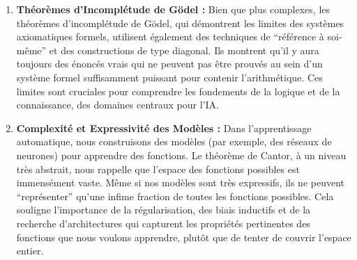 \documentclass[12pt,a4paper]{report}
\providecommand{\tightlist}{%
  \setlength{\itemsep}{0pt}\setlength{\parskip}{0pt}}
\begin{document}
\begin{enumerate}
  \begin{itemize}
  \tightlist
  \item
    Le théorème de Cantor montre que l'ensemble des sous-ensembles d'un
    ensemble est ``plus grand'' que l'ensemble lui-même. En IA, cela
    peut être interprété comme une limite à la capacité de représenter
    toutes les ``idées'' ou ``concepts'' (qui pourraient être vus comme
    des sous-ensembles d'un espace de base) en utilisant un système de
    symboles ou un langage formel qui a la même ``taille'' que l'espace
    de base.
  \item
    Par exemple, l'ensemble des fonctions de \(\mathbb{N}\) vers
    \(\mathbb{N}\) est non-dénombrable (a la même cardinalité que
    \(\mathcal{P}(\mathbb{N})\)), tandis que l'ensemble des programmes
    informatiques est dénombrable. Cela signifie qu'il existe infiniment
    plus de fonctions que de programmes pour les calculer. La plupart
    des fonctions ne sont donc pas calculables par un algorithme. C'est
    une limite fondamentale pour l'IA symbolique et algorithmique.
  \end{itemize}
\item
  \textbf{Théorèmes d'Incomplétude de Gödel :} Bien que plus complexes,
  les théorèmes d'incomplétude de Gödel, qui démontrent les limites des
  systèmes axiomatiques formels, utilisent également des techniques de
  ``référence à soi-même'' et des constructions de type diagonal. Ils
  montrent qu'il y aura toujours des énoncés vrais qui ne peuvent pas
  être prouvés au sein d'un système formel suffisamment puissant pour
  contenir l'arithmétique. Ces limites sont cruciales pour comprendre
  les fondements de la logique et de la connaissance, des domaines
  centraux pour l'IA.
\item
  \textbf{Complexité et Expressivité des Modèles :} Dans l'apprentissage
  automatique, nous construisons des modèles (par exemple, des réseaux
  de neurones) pour apprendre des fonctions. Le théorème de Cantor, à un
  niveau très abstrait, nous rappelle que l'espace des fonctions
  possibles est immensément vaste. Même si nos modèles sont très
  expressifs, ils ne peuvent ``représenter'' qu'une infime fraction de
  toutes les fonctions possibles. Cela souligne l'importance de la
  régularisation, des biais inductifs et de la recherche d'architectures
  qui capturent les propriétés pertinentes des fonctions que nous
  voulons apprendre, plutôt que de tenter de couvrir l'espace entier.
\end{enumerate}
\end{document}
